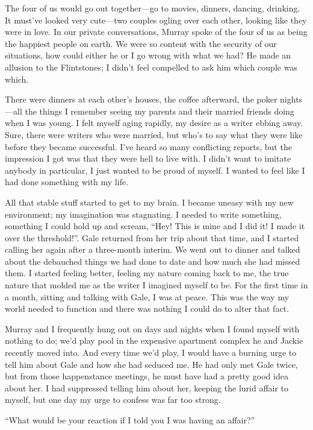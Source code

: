 The four of us would go out together---go to movies, dinners, dancing,
drinking. It must've looked very cute---two couples ogling over each
other, looking like they were in love. In our private conversations,
Murray spoke of the four of us as being the happiest people on earth. We
were so content with the security of our situations, how could either he
or I go wrong with what we had? He made an allusion to the Flintstones;
I didn't feel compelled to ask him which couple was which.

There were dinners at each other's houses, the coffee afterward, the
poker nights---all the things I remember seeing my parents and their
married friends doing when I was young. I felt myself aging rapidly, my
desire as a writer ebbing away. Sure, there were writers who were
married, but who's to say what they were like before they became
successful. I've heard so many conflicting reports, but the impression I
got was that they were hell to live with. I didn't want to imitate
anybody in particular, I just wanted to be proud of myself. I wanted to
feel like I had done something with my life.

All that stable stuff started to get to my brain. I became uneasy with
my new environment; my imagination was stagnating. I needed to write
something, something I could hold up and scream, ``Hey! This is mine and
I did it! I made it over the threshold!''. Gale returned from her trip
about that time, and I started calling her again after a three-month
interim. We went out to dinner and talked about the debauched things we
had done to date and how much she had missed them. I started feeling
better, feeling my nature coming back to me, the true nature that molded
me as the writer I imagined myself to be. For the first time in a month,
sitting and talking with Gale, I was at peace. This was the way my world
needed to function and there was nothing I could do to alter that fact.

Murray and I frequently hung out on days and nights when I found myself
with nothing to do; we'd play pool in the expensive apartment complex he
and Jackie recently moved into. And every time we'd play, I would have a
burning urge to tell him about Gale and how she had seduced me. He had
only met Gale twice, but from those happenstance meetings, he must have
had a pretty good idea about her. I had suppressed telling him about
her, keeping the lurid affair to myself, but one day my urge to confess
was far too strong.

``What would be your reaction if I told you I was having an affair?''

